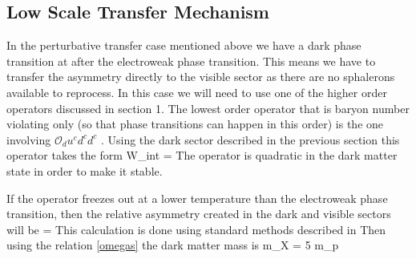 \subsection{Low Scale Transfer Mechanism}
In the perturbative transfer case mentioned above we have a dark phase transition at after the electroweak phase transition. This means we have to transfer the 
asymmetry directly to the visible sector as there are no sphalerons available to reprocess. In this case we will need to use one of the higher order operators 
discussed in section 1. The lowest order operator that is baryon number violating only (so that phase transitions can happen in this order) is the one involving 
$\mathcal{O}_d u^c d^c d^c$ \cite{darko}. Using the dark sector described in the previous section this operator takes the form
\beq
    W_{int} = 
\eeq
The operator is quadratic in the dark matter state in order to make it stable.

If the operator freezes out at a lower temperature than the electroweak phase transition, then the relative asymmetry created in the dark and visible sectors 
will be \cite{darko} 
\beq
     = 
\eeq
This calculation is done using standard methods described in \cite{asymm} 
Then using the relation \ref{omegas} the dark matter mass is
\beq
    m_X = 5  m_p  
\eeq


